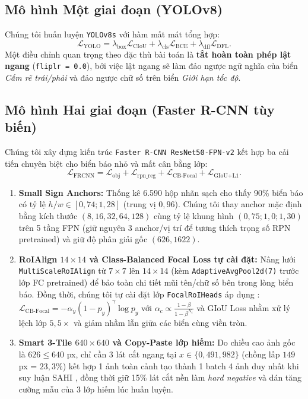\documentclass[11pt]{article}
\begin{document}
\subsection{Mô hình Một giai đoạn (YOLOv8)}
Chúng tôi huấn luyện \texttt{YOLOv8s} với hàm mất mát tổng hợp:
\begin{equation}
  \mathcal{L}_{\text{YOLO}} = \lambda_{\text{box}}\mathcal{L}_{\text{CIoU}} + \lambda_{\text{cls}}\mathcal{L}_{\text{BCE}} + \lambda_{\text{dfl}}\mathcal{L}_{\text{DFL}}.
\end{equation}
Một điều chỉnh quan trọng theo đặc thù bài toán là \textbf{tắt hoàn toàn phép lật ngang} (\texttt{fliplr = 0.0}), bởi việc lật ngang sẽ làm đảo ngược ngữ nghĩa của biển \textit{Cấm rẽ trái/phải} và đảo ngược chữ số trên biển \textit{Giới hạn tốc độ}.

\subsection{Mô hình Hai giai đoạn (Faster R-CNN tùy biến)}
Chúng tôi xây dựng kiến trúc \texttt{Faster R-CNN ResNet50-FPN-v2} kết hợp ba cải tiến chuyên biệt cho biển báo nhỏ và mất cân bằng lớp:
\begin{equation}
  \mathcal{L}_{\text{FRCNN}} = \mathcal{L}_{\text{obj}} + \mathcal{L}_{\text{rpn\_reg}} + \mathcal{L}_{\text{CB-Focal}} + \mathcal{L}_{\text{GIoU+L1}}.
\end{equation}
\begin{enumerate}
  \item \textbf{Small Sign Anchors:} Thống kê 6.590 hộp nhãn sạch cho thấy 90\% biển báo có tỷ lệ $h/w \in [0{,}74; 1{,}28]$ (trung vị $0{,}96$). Chúng tôi thay anchor mặc định bằng kích thước $(8, 16, 32, 64, 128)$ cùng tỷ lệ khung hình $(0{,}75; 1{,}0; 1{,}30)$ trên 5 tầng FPN (giữ nguyên 3 anchor/vị trí để tương thích trọng số RPN pretrained) và giữ độ phân giải gốc $(626, 1622)$.
  \item \textbf{RoIAlign $14\times 14$ và Class-Balanced Focal Loss tự cài đặt:} Nâng lưới \texttt{MultiScaleRoIAlign} từ $7\times 7$ lên $14\times 14$ (kèm \texttt{AdaptiveAvgPool2d(7)} trước lớp FC pretrained) để bảo toàn chi tiết mũi tên/chữ số bên trong lòng biển báo. Đồng thời, chúng tôi tự cài đặt lớp \texttt{FocalRoIHeads} áp dụng \citep{lin2017focal,cui2019class}: $\mathcal{L}_{\text{CB-Focal}} = -\alpha_y(1-p_y)^\gamma \log p_y$ với $\alpha_c \propto \frac{1-\beta}{1-\beta^{N_c}}$ và GIoU Loss \citep{rezatofighi2019generalized} nhằm xử lý lệch lớp $5{,}5\times$ và giảm nhầm lẫn giữa các biển cùng viền tròn.
  \item \textbf{Smart 3-Tile $640\times 640$ và Copy-Paste lớp hiếm:} Do chiều cao ảnh gốc là $626 \le 640$ px, chỉ cần 3 lát cắt ngang tại $x \in \{0, 491, 982\}$ (chồng lấp $149$ px = $23{,}3\%$) kết hợp 1 ảnh toàn cảnh tạo thành 1 batch 4 ảnh duy nhất khi suy luận SAHI \citep{akyon2022sahi}, đồng thời giữ 15\% lát cắt nền làm \textit{hard negative} và dán tăng cường mẫu của 3 lớp hiếm lúc huấn luyện.
\end{enumerate}
\end{document}
